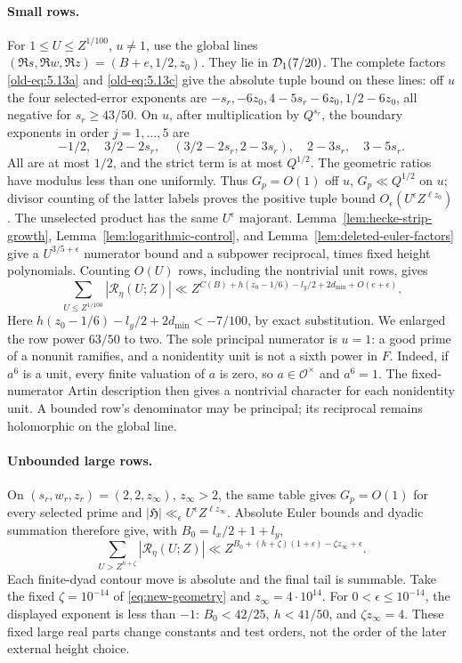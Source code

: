 \documentclass[12pt]{article}
\begin{document}
\paragraph{Small rows.}
For \(1\le U\le Z^{1/100}\), \(u\ne1\), use the global lines
\((\Re s,\Re w,\Re z)=(B+e,1/2,z_0)\).
They lie in \({\cal D}_1(7/20)\).
The complete factors \eqref{old-eq:5.13a} and \eqref{old-eq:5.13c}
give the absolute tuple bound on these lines: off \(u\) the four selected-error exponents are
\(-s_r,-6z_0,4-5s_r-6z_0,1/2-6z_0\), all negative for
\(s_r\ge43/50\).
On \(u\), after multiplication by \(Q^{s_r}\), the boundary
exponents in order \(j=1,\ldots,5\) are
\[
 -1/2,\quad3/2-2s_r,\quad(3/2-2s_r,2-3s_r),
             \quad2-3s_r,\quad3-5s_r .
\]
All are at most \(1/2\), and the strict term is at most \(Q^{1/2}\).
The geometric ratios have modulus less than one uniformly.
Thus \(G_p=O(1)\) off \(u\), \(G_p\ll Q^{1/2}\) on \(u\);
divisor counting of the latter labels proves the positive tuple
bound \(O_\epsilon(U^\epsilon Z^{\ell z_0})\).
The unselected product has the same \(U^\epsilon\) majorant.
Lemma~\ref{lem:hecke-strip-growth}, Lemma~\ref{lem:logarithmic-control},
and Lemma~\ref{lem:deleted-euler-factors} give a
\(U^{3/5+\epsilon}\) numerator bound and a subpower reciprocal,
times fixed height polynomials.
Counting \(O(U)\) rows, including the nontrivial unit rows, gives
\[
 \sum_{U\le Z^{1/100}}|\mathcal R_\eta(U;Z)|
 \ll Z^{C(B)+h(z_0-1/6)-l_y/2+2d_{\min}+O(e+\epsilon)}.
\]
Here \(h(z_0-1/6)-l_y/2+2d_{\min}<-7/100\), by exact
substitution.  We enlarged the row power \(63/50\) to two.
The sole principal numerator is \(u=1\): a good prime of a
nonunit ramifies, and a nonidentity unit is not a sixth power in \(F\).
Indeed, if \(a^6\) is a unit, every finite valuation of \(a\)
is zero, so \(a\in\mathcal O^\times\) and \(a^6=1\).
The fixed-numerator Artin description then gives a nontrivial
character for each nonidentity unit.
A bounded row's denominator may be principal; its reciprocal
remains holomorphic on the global line.

\paragraph{Unbounded large rows.}
On \((s_r,w_r,z_r)=(2,2,z_\infty)\), \(z_\infty>2\),
the same table gives \(G_p=O(1)\) for every selected prime and
\(|\mathfrak H|\ll_\epsilon U^\epsilon Z^{\ell z_\infty}\).
Absolute Euler bounds and dyadic summation therefore give, with
\(B_0=l_x/2+1+l_y\),
\[
 \sum_{U>Z^{h+\zeta}}|\mathcal R_\eta(U;Z)|
 \ll Z^{B_0+(h+\zeta)(1+\epsilon)-\zeta z_\infty+\epsilon}.
\]
Each finite-dyad contour move is absolute and the final tail
is summable.  Take the fixed \(\zeta=10^{-14}\) of
\eqref{eq:new-geometry} and \(z_\infty=4\cdot10^{14}\).
For \(0<\epsilon\le10^{-14}\), the displayed exponent is less
than \(-1\): \(B_0<42/25,\ h<41/50\), and
\(\zeta z_\infty=4\).
These fixed large real parts change constants and test orders,
not the order of the later external height choice.
\end{document}
